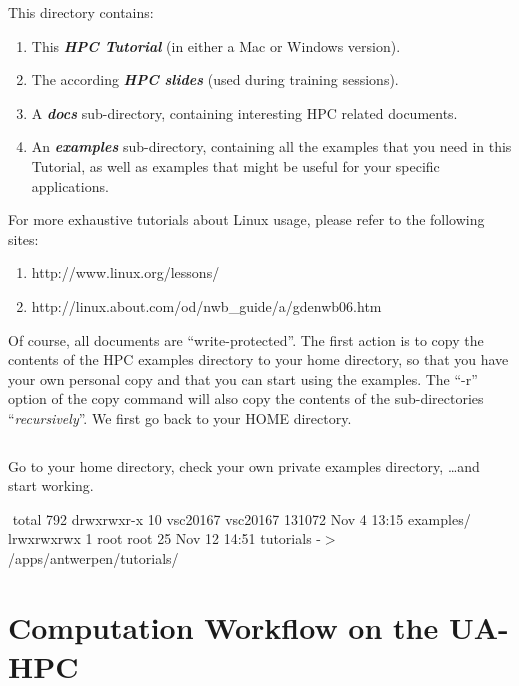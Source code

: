 This directory contains:

\begin{enumerate}
\item  This \textbf{\textit{HPC Tutorial}} (in either a Mac or Windows version).
\item  The according \textbf{\textit{HPC slides}} (used during training sessions).
\item  A \textbf{\textit{docs}} sub-directory, containing interesting HPC related documents.
\item  An \textbf{\textit{examples}} sub-directory, containing all the examples that you need in this Tutorial, as well as examples that might be useful for your specific applications.
\end{enumerate}

\textbf{} For more exhaustive tutorials about Linux usage, please refer to the following sites:

\begin{enumerate}
\item  http://www.linux.org/lessons/\textit{}
\item \textit{ }http://linux.about.com/od/nwb\_guide/a/gdenwb06.htm\textit{}
\end{enumerate}

Of course, all documents are ``write-protected''. The first action is to copy the contents of the HPC examples directory to your home directory, so that you have your own personal copy and that you can start using the examples. The ``-r'' option of the copy command will also copy the contents of the sub-directories ``\textit{recursively}''.  We first go back to your HOME directory.

\begin{prompt}
$ %
$ %
\end{prompt}

Go to your home directory, check your own private examples directory, \dots  and start working.

\begin{prompt}
$ %
$ %
total 792
drwxrwxr-x 10 vsc20167 vsc20167 131072 Nov  4 13:15 examples/
lrwxrwxrwx 1  root     root         25 Nov 12 14:51 tutorials -$>$ /apps/antwerpen/tutorials/
\end{prompt}

\section{Computation Workflow on the UA-HPC}

